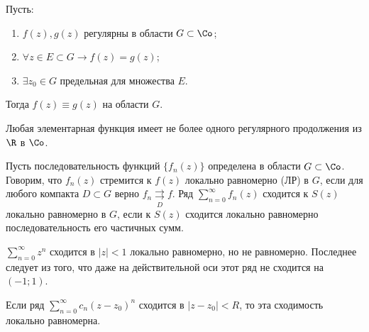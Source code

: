 \begin{corollary}
    Пусть:
    \begin{enumerate}[wide=20pt, label=\arabic*., itemsep=0ex]
        \item \(f(z), g(z)\) регулярны в области \(G \subset \Co\);
        \item \(\forall z \in E \subset G \rightarrow f(z) = g(z)\);
        \item \(\exists z_0 \in G\) предельная для множества \(E\).
    \end{enumerate}
    Тогда \(f(z) \equiv g(z)\) на области \(G\).
\end{corollary}

\begin{corollary}
    Любая элементарная функция имеет не более одного регулярного продолжения из \(\R\) в \(\Co\).
\end{corollary}



\begin{definition}
    Пусть последовательность функций \(\{f_n(z)\}\) определена в области \(G \subset \Co\). Говорим,
    что \(f_n(z)\) стремится к \(f(z)\) локально равномерно (ЛР) в \(G\), если для любого компакта 
    \(D \subset G\) верно \(f_n \mathrel{\mathop{\rightrightarrows}\limits_{D}} f\). Ряд 
    \(\sum\limits_{n=0}^\infty f_n(z)\) сходится к \(S(z)\) локально равномерно в \(G\), если к
    \(S(z)\) сходится локально равномерно последовательность его частичных сумм.
\end{definition}

\begin{example}
    \(\sum\limits_{n = 0}^\infty z^n\) сходится в \(|z| < 1\) локально равномерно, но не равномерно.
    Последнее следует из того, что даже на действительной оси этот ряд не сходится на \((-1; 1)\).
\end{example}

\begin{note}
    Если ряд \(\sum\limits_{n = 0}^\infty c_n(z-z_0)^n\) сходится в \(|z-z_0| < R\), то эта 
    сходимость локально равномерна.
\end{note}

